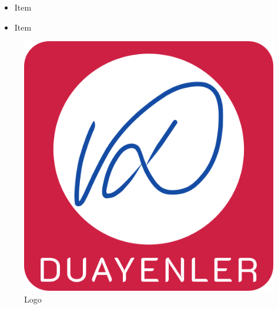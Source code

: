 \documentclass[a4paper,12pt]{article}
\makeatletter
\newcommand{\specialcell}[2][c]{ \begin{tabular}[#1]{@{}c@{}}#2\end{tabular}} %
\makeatother
\begin{document}
% 
%      

\appendix









\begin{itemize}
	\item Item
	\item Item
\end{itemize}


\begin{figure}[H]
\centering
\setlength{\unitlength}{\textwidth} 
\includegraphics[width=0.7\unitlength]{images/logo1}
\caption{\label{fig:logo}Logo }
\end{figure}
\end{document}
